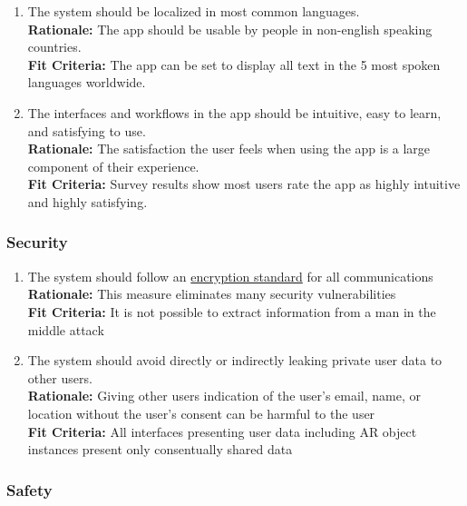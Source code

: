 \documentclass{article}
\begin{document}
\begin{enumerate}[align=left, label=\textbf{QS-U\arabic*.}]

    \item The system should be localized in most common languages. \\
          {\bf Rationale:} The app should be usable by people in non-english speaking countries. \\
          {\bf Fit Criteria:} The app can be set to display all text in the 5 most spoken languages worldwide. \\
    \item The interfaces and workflows in the app should be intuitive, easy to learn, and satisfying to use. \\
          {\bf Rationale:} The satisfaction the user feels when using the app is a large component of their experience. \\
          {\bf Fit Criteria:} Survey results show most users rate the app as highly intuitive and highly satisfying.
\end{enumerate}

\subsubsection{Security}
\label{sub:security}

\begin{enumerate}[align=left, label=\textbf{QS-SC\arabic*.}]

    \item The system should follow an \hyperref[def:encryption_standard]{encryption standard} for all communications \\
          {\bf Rationale:} This measure eliminates many security vulnerabilities \\
          {\bf Fit Criteria:} It is not possible to extract information from a man in the middle attack
    \item The system should avoid directly or indirectly leaking private user data to other users. \\
          {\bf Rationale:} Giving other users indication of the user's email, name, or location without the user's consent can be harmful to the user \\
          {\bf Fit Criteria:} All interfaces presenting user data including AR object instances present only consentually shared data
\end{enumerate}

\subsubsection{Safety}
\end{document}
